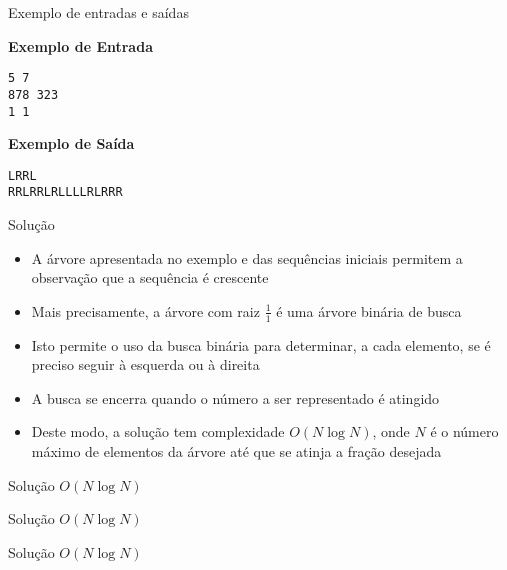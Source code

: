 \begin{frame}[fragile]{Exemplo de entradas e saídas}

\begin{minipage}[t]{0.5\textwidth}
\textbf{Exemplo de Entrada}
\begin{verbatim}
5 7
878 323
1 1
\end{verbatim}
\end{minipage}
\begin{minipage}[t]{0.45\textwidth}
\textbf{Exemplo de Saída}
\begin{verbatim}
LRRL
RRLRRLRLLLLRLRRR
\end{verbatim}
\end{minipage}
\end{frame}

\begin{frame}[fragile]{Solução}

    \begin{itemize}
        \item A árvore apresentada no exemplo e das sequências iniciais permitem a observação
            que a sequência é crescente

        \item Mais precisamente, a árvore com raiz $\frac{1}{1}$ é uma árvore binária de busca

        \item Isto permite o uso da busca binária para determinar, a cada elemento, se é 
            preciso seguir à esquerda ou à direita

        \item A busca se encerra quando o número a ser representado é atingido

        \item Deste modo, a solução tem complexidade $O(N\log N)$, onde $N$ é o número máximo
            de elementos da árvore até que se atinja a fração desejada
   \end{itemize}

\end{frame}

\begin{frame}[fragile]{Solução $O(N\log N)$}
\end{frame}

\begin{frame}[fragile]{Solução $O(N\log N)$}
\end{frame}

\begin{frame}[fragile]{Solução $O(N\log N)$}
\end{frame}
